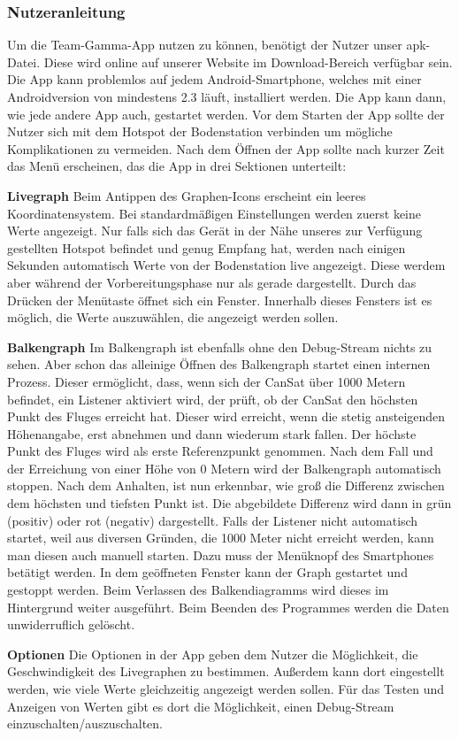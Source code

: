 \subsubsection{Nutzeranleitung}
Um die Team-Gamma-App nutzen zu können, benötigt der Nutzer unser apk-Datei. Diese wird online auf unserer Website im Download-Bereich verfügbar sein. Die App kann problemlos auf jedem Android-Smartphone, welches mit einer Androidversion von mindestens 2.3 läuft, installiert werden. Die App kann dann, wie jede andere App auch, gestartet werden. Vor dem Starten der App sollte der Nutzer sich mit dem Hotspot der Bodenstation verbinden um mögliche Komplikationen zu vermeiden. Nach dem Öffnen der App sollte nach kurzer Zeit das Menü erscheinen, das die App in drei Sektionen unterteilt: 

\begin{description}
	\item \textbf{Livegraph}
	Beim Antippen des Graphen-Icons erscheint ein leeres Koordinatensystem. Bei standardmäßigen Einstellungen werden zuerst keine Werte angezeigt. Nur falls sich das Gerät in der Nähe unseres zur Verfügung gestellten Hotspot befindet und genug Empfang hat, werden nach einigen Sekunden automatisch Werte von der Bodenstation live angezeigt. Diese werdem aber während der Vorbereitungsphase nur als gerade dargestellt. Durch das Drücken der Menütaste öffnet sich ein Fenster. Innerhalb dieses Fensters ist es möglich, die Werte auszuwählen, die angezeigt werden sollen.
	
	\item \textbf{Balkengraph}
	Im Balkengraph ist ebenfalls ohne den Debug-Stream nichts zu sehen. Aber schon das alleinige Öffnen des Balkengraph startet einen internen Prozess. Dieser ermöglicht, dass, wenn sich der CanSat über 1000 Metern befindet, ein Listener aktiviert wird, der prüft, ob der CanSat den höchsten Punkt des Fluges erreicht hat. Dieser wird erreicht, wenn die stetig ansteigenden Höhenangabe, erst abnehmen und dann wiederum stark fallen. Der höchste Punkt des Fluges wird als erste Referenzpunkt genommen. Nach dem Fall und der Erreichung von einer Höhe von 0 Metern wird der Balkengraph automatisch stoppen. Nach dem Anhalten, ist nun erkennbar, wie groß die Differenz zwischen dem höchsten und tiefsten Punkt ist. Die abgebildete Differenz wird dann in grün (positiv) oder rot (negativ) dargestellt. Falls der Listener nicht automatisch startet, weil aus diversen Gründen, die 1000 Meter nicht erreicht werden, kann man diesen auch manuell starten. Dazu muss der Menüknopf des Smartphones betätigt werden. In dem geöffneten Fenster kann der Graph gestartet und gestoppt werden. Beim Verlassen des Balkendiagramms wird dieses im Hintergrund weiter ausgeführt. Beim Beenden des Programmes werden die Daten unwiderruflich gelöscht.
	
	\item \textbf{Optionen}
	Die Optionen in der App geben dem Nutzer die Möglichkeit, die Geschwindigkeit des Livegraphen zu bestimmen. Außerdem kann dort eingestellt werden, wie viele Werte gleichzeitig angezeigt werden sollen. Für das Testen und Anzeigen von Werten gibt es dort die Möglichkeit, einen Debug-Stream einzuschalten/auszuschalten.
\end{description}